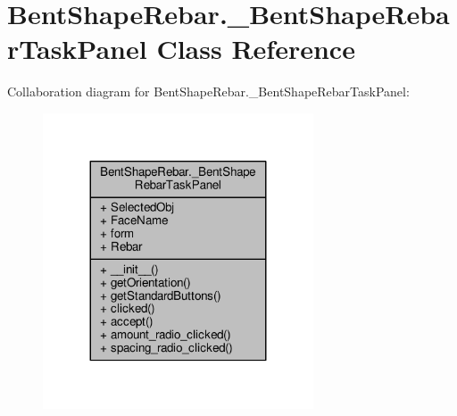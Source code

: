 \hypertarget{classBentShapeRebar_1_1__BentShapeRebarTaskPanel}{}\section{Bent\+Shape\+Rebar.\+\_\+\+Bent\+Shape\+Rebar\+Task\+Panel Class Reference}
\label{classBentShapeRebar_1_1__BentShapeRebarTaskPanel}


Collaboration diagram for Bent\+Shape\+Rebar.\+\_\+\+Bent\+Shape\+Rebar\+Task\+Panel\+:\nopagebreak
\begin{figure}[H]
\begin{center}
\leavevmode
\includegraphics[width=227pt]{classBentShapeRebar_1_1__BentShapeRebarTaskPanel__coll__graph}
\end{center}
\end{figure}
